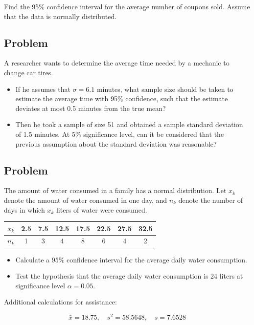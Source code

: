 \documentclass[a4paper, 12pt]{article}
\begin{document}
Find the 95\% confidence interval for the average number of coupons sold. Assume that the data is normally distributed.



\subsection{Problem}
A researcher wants to determine the average time needed by a mechanic to change car tires.
\begin{itemize}
  
\item [a)] If he assumes that $\sigma = 6.1$ minutes, what sample size should be taken to estimate the average time with 95\% confidence, such that the estimate deviates at most 0.5 minutes from the true mean?

\item [b)]  Then he took a sample of size 51 and obtained a sample standard deviation of 1.5 minutes. At $5\%$ significance level, can it be considered that the previous assumption about the standard deviation was reasonable?

\end{itemize}

\subsection{Problem}
The amount of water consumed in a family has a normal distribution. Let $x_k$ denote the amount of water consumed in one day, and $n_k$ denote the number of days in which $x_k$ liters of water were consumed.

\begin{table}[h!]
\centering
\begin{tabular}{|c|c|c|c|c|c|c|c|}
\hline
$x_k$ & 2.5 & 7.5 & 12.5 & 17.5 & 22.5 & 27.5 & 32.5 \\ \hline
$n_k$ & 1   & 3   & 4    & 8    & 6    & 4    & 2    \\ \hline
\end{tabular}
\end{table}

\begin{itemize}
  \item [a)] Calculate a $95\%$ confidence interval for the average daily water consumption.

  \item [b)] Test the hypothesis that the average daily water consumption is 24 liters at significance level $\alpha = 0.05$.
\end{itemize}

Additional calculations for assistance:

\[
\bar{x} = 18.75, \quad s^2 = 58.5648, \quad s = 7.6528
\]
\end{document}
